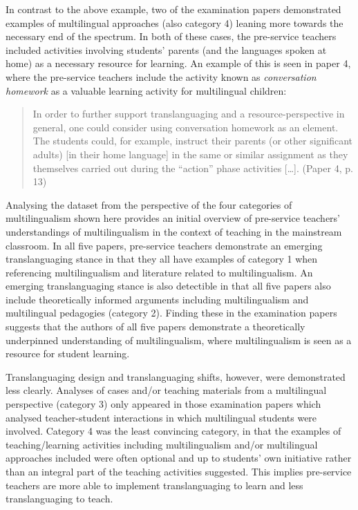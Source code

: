 \documentclass[output=paper]{langscibook}
\begin{document}
In contrast to the above example, two of the examination papers demonstrated examples of multilingual approaches (also category 4) leaning more towards the necessary end of the spectrum. In both of these cases, the pre-service teachers included activities involving students’ parents (and the languages spoken at home) as a necessary resource for learning. An example of this is seen in paper 4, where the pre-service teachers include the activity known as \textit{conversation homework} as a valuable learning activity for multilingual children:

\begin{quote}
In order to further support translanguaging and a resource-perspective in general, one could consider using conversation homework as an element. The students could, for example, instruct their parents (or other significant adults) [in their home language] in the same or similar assignment as they themselves carried out during the “action” phase activities […]. (Paper 4, p. 13)
\end{quote}

Analysing the dataset from the perspective of the four categories of multilingualism shown here provides an initial overview of pre-service teachers’ understandings of multilingualism in the context of teaching in the mainstream classroom. In all five papers, pre-service teachers demonstrate an emerging translanguaging stance in that they all have examples of category 1 when referencing multilingualism and literature related to multilingualism. An emerging translanguaging stance is also detectible in that all five papers also include theoretically informed arguments including multilingualism and multilingual pedagogies (category 2). Finding these in the examination papers suggests that the authors of all five papers demonstrate a theoretically underpinned understanding of multilingualism, where multilingualism is seen as a resource for student learning.

Translanguaging design and translanguaging shifts, however, were demonstrated less clearly. Analyses of cases and/or teaching materials from a multilingual perspective (category 3) only appeared in those examination papers which analysed teacher-student interactions in which multilingual students were involved. Category 4 was the least convincing category, in that the examples of teaching/learning activities including multilingualism and/or multilingual approaches included were often optional and up to students’ own initiative rather than an integral part of the teaching activities suggested. This implies pre-service teachers are more able to implement translanguaging to learn and less translanguaging to teach.
\end{document}
